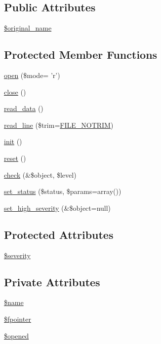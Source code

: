 \subsection*{Public Attributes}
\begin{DoxyCompactItemize}
\item 
\hyperlink{classImageHandler_a1712c9444d65879aab111260767afaab}{\$original\_\-name}
\end{DoxyCompactItemize}
\subsection*{Protected Member Functions}
\begin{DoxyCompactItemize}
\item 
\hyperlink{classFileHandler_a2a650b033c4eb1f98ba47fb05ce7b454}{open} (\$mode= 'r')
\item 
\hyperlink{classFileHandler_aa48e7c3b67346e29b194d2f0ac5dd1f8}{close} ()
\item 
\hyperlink{classFileHandler_a1389a6ea19a22471c301d70b5ed68ed8}{read\_\-data} ()
\item 
\hyperlink{classFileHandler_a69f84a8138f717c84f560125f1f95448}{read\_\-line} (\$trim=\hyperlink{class_8filehandler_8php_a3720f2e15eb9e16e29d8ecbb96763662}{FILE\_\-NOTRIM})
\item 
\hyperlink{class__OWL_ae0ef3ded56e8a6b34b6461e5a721cd3e}{init} ()
\item 
\hyperlink{class__OWL_a2f2a042bcf31965194c03033df0edc9b}{reset} ()
\item 
\hyperlink{class__OWL_ad6f4f6946f40199dd0333cf219fa500e}{check} (\&\$object, \$level)
\item 
\hyperlink{class__OWL_aea912d0ede9b3c2a69b79072d94d4787}{set\_\-status} (\$status, \$params=array())
\item 
\hyperlink{class__OWL_a576829692a3b66e3d518853bf43abae3}{set\_\-high\_\-severity} (\&\$object=null)
\end{DoxyCompactItemize}
\subsection*{Protected Attributes}
\begin{DoxyCompactItemize}
\item 
\hyperlink{class__OWL_ad26b40a9dbbacb33e299b17826f8327c}{\$severity}
\end{DoxyCompactItemize}
\subsection*{Private Attributes}
\begin{DoxyCompactItemize}
\item 
\hyperlink{classImageHandler_a517b3d7ff8643cca1dc2080523bfe2d6}{\$name}
\item 
\hyperlink{classImageHandler_ac56acda82f7ece75d33f6c57845a727e}{\$fpointer}
\item 
\hyperlink{classImageHandler_a6a87b3626bd0a457c6937b3e9b1cc69b}{\$opened}
\end{DoxyCompactItemize}


